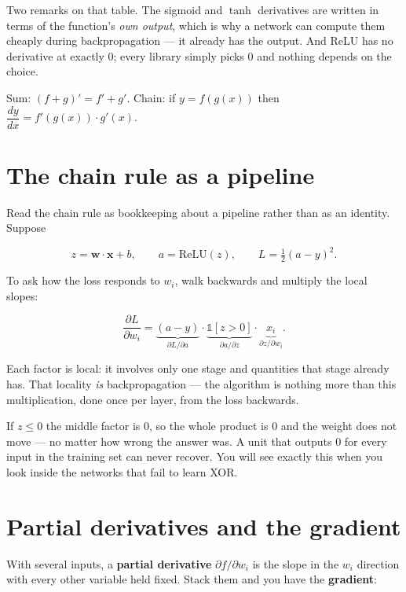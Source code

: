 \documentclass[11pt]{article}
\begin{document}
Two remarks on that table. The sigmoid and $\tanh$ derivatives are written in
terms of the function's \emph{own output}, which is why a network can compute
them cheaply during backpropagation --- it already has the output. And ReLU has
no derivative at exactly $0$; every library simply picks $0$ and nothing
depends on the choice.

\begin{keybox}
Sum: $(f+g)' = f' + g'$.\quad
Chain: if $y = f(g(x))$ then $\dfrac{dy}{dx} = f'(g(x))\cdot g'(x)$.
\end{keybox}

\section{The chain rule as a pipeline}

Read the chain rule as bookkeeping about a pipeline rather than as an
identity. Suppose

\[
z = \boldsymbol{w}\cdot\boldsymbol{x} + b, \qquad
a = \mathrm{ReLU}(z), \qquad
L = \tfrac{1}{2}(a - y)^2 .
\]

To ask how the loss responds to $w_i$, walk backwards and multiply the local
slopes:

\[
\frac{\partial L}{\partial w_i}
= \underbrace{(a - y)}_{\partial L / \partial a}
\cdot \underbrace{\mathbb{1}[z>0]}_{\partial a / \partial z}
\cdot \underbrace{x_i}_{\partial z / \partial w_i}.
\]

Each factor is local: it involves only one stage and quantities that stage
already has. That locality \emph{is} backpropagation --- the algorithm is nothing
more than this multiplication, done once per layer, from the loss backwards.

\begin{keybox}
 If $z \le 0$ the middle factor is $0$, so the
whole product is $0$ and the weight does not move --- no matter how wrong the
answer was. A unit that outputs $0$ for every input in the training set can
never recover. You will see exactly this when you look inside the networks that
fail to learn XOR.
\end{keybox}

\section{Partial derivatives and the gradient}

With several inputs, a \textbf{partial derivative}
$\partial f/\partial w_i$ is the slope in the $w_i$ direction with every other
variable held fixed. Stack them and you have the \textbf{gradient}:
\end{document}
